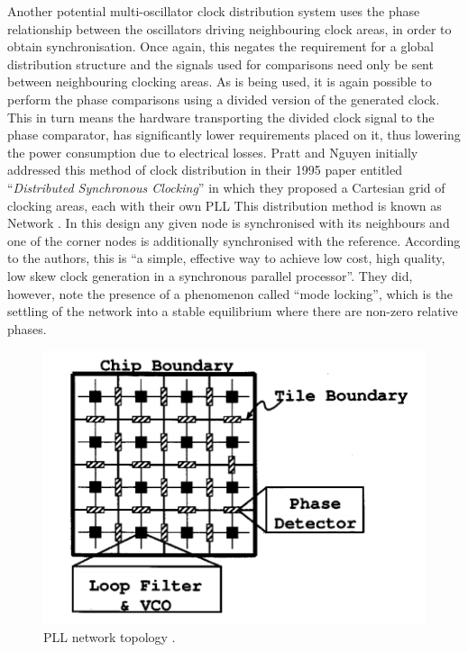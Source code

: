 Another potential multi-oscillator clock distribution system uses the phase relationship between the oscillators driving neighbouring clock areas, in order to obtain synchronisation. Once again, this negates the requirement for a global distribution structure and the signals used for comparisons need only be sent between neighbouring clocking areas. As  is being used, it is again possible to perform the phase comparisons using a divided version of the generated clock. This in turn means the hardware transporting the divided clock signal to the phase comparator, has significantly lower requirements placed on it, thus lowering the power consumption due to electrical losses. Pratt and Nguyen initially addressed this method of clock distribution in their 1995 paper entitled ``\textit{Distributed Synchronous Clocking}'' in which they proposed a Cartesian grid of clocking areas, each with their own \ac{PLL} This distribution method is known as  Network \cite{pratt1995distributed}. In this design any given node is synchronised with its neighbours and one of the corner nodes is additionally synchronised with the reference. According to the authors, this is ``a simple, effective way to achieve low cost, high quality, low skew clock generation in a synchronous parallel processor''. They did, however, note the presence of a phenomenon called ``mode locking'', which is the settling of the network into a stable equilibrium where there are non-zero relative phases.

\begin{figure}[h]
	\centering
	\includegraphics[scale=0.7]{../gutnik2000active}
	\caption[PLL network topology ]{PLL network topology \cite{gutnik2000active}.}
	\label{fig:gutnik2000active}
\end{figure}

